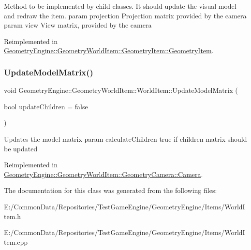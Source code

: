 Method to be implemented by child classes. It should update the visual model and redraw the item. param projection Projection matrix provided by the camera param view View matrix, provided by the camera 

Reimplemented in \mbox{\hyperlink{class_geometry_engine_1_1_geometry_world_item_1_1_geometry_item_1_1_geometry_item_aa07c13861cf4aef269442071e4150389}{Geometry\+Engine\+::\+Geometry\+World\+Item\+::\+Geometry\+Item\+::\+Geometry\+Item}}.

\mbox{\label{class_geometry_engine_1_1_geometry_world_item_1_1_world_item_a86effd24c41c87be8925ee3addd8c33d}} 
\subsubsection{\texorpdfstring{UpdateModelMatrix()}{UpdateModelMatrix()}}
{\footnotesize\ttfamily void Geometry\+Engine\+::\+Geometry\+World\+Item\+::\+World\+Item\+::\+Update\+Model\+Matrix (\begin{DoxyParamCaption}\item[{bool}]{update\+Children = {\ttfamily false} }\end{DoxyParamCaption})\hspace{0.3cm}{\ttfamily [virtual]}}

Updates the model matrix param calculate\+Children true if children matrix should be updated 

Reimplemented in \mbox{\hyperlink{class_geometry_engine_1_1_geometry_world_item_1_1_geometry_camera_1_1_camera_afe7145a1edb13ce3a50c2964f5c865e9}{Geometry\+Engine\+::\+Geometry\+World\+Item\+::\+Geometry\+Camera\+::\+Camera}}.



The documentation for this class was generated from the following files\+:\begin{DoxyCompactItemize}
\item 
E\+:/\+Common\+Data/\+Repositories/\+Test\+Game\+Engine/\+Geometry\+Engine/\+Items/World\+Item.\+h\item 
E\+:/\+Common\+Data/\+Repositories/\+Test\+Game\+Engine/\+Geometry\+Engine/\+Items/World\+Item.\+cpp\end{DoxyCompactItemize}
